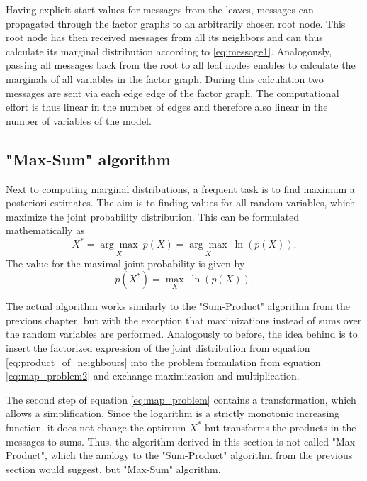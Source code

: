 \documentclass{sigkdd}
\begin{document}
Having explicit start values for messages from the leaves, messages can propagated through the factor graphs to an arbitrarily chosen root node. This root node has then received messages from all its neighbors and can thus calculate its marginal distribution according to \ref{eq:message1}. Analogously, passing all messages back from the root to all leaf nodes enables to calculate the marginals of all variables in the factor graph. During this calculation two messages are sent via each edge edge of the factor graph. The computational effort is thus linear in the number of edges and therefore also linear in the number of variables of the model.\\

\subsection{"Max-Sum" algorithm}
Next to computing marginal distributions, a frequent task is to find maximum a posteriori estimates. The aim is to finding values for all random variables, which maximize the joint probability distribution. This can be formulated mathematically as
\begin{equation}\label{eq:map_problem}
X^* = \underset{X}{\arg\max}~ p(X) = \underset{X}{\arg\max}~ \ln (p(X)).
\end{equation}
The value for the maximal joint probability is given by
\begin{equation}\label{eq:map_problem2}
p(X^*) = \underset{X}{\max}~ \ln (p(X)).
\end{equation}


The actual algorithm works similarly to the "Sum-Product" algorithm from the previous chapter, but with the exception that maximizations instead of sums over the random variables are performed. Analogously to before, the idea behind is to insert the factorized expression of the joint distribution from equation \ref{eq:product_of_neighbours} into the problem formulation from equation \ref{eq:map_problem2} and exchange maximization and multiplication.

The second step of equation \ref{eq:map_problem} contains a transformation, which allows a simplification. Since the logarithm is a strictly monotonic increasing function, it does not change the optimum $X^*$ but transforms the products in the messages to sums. Thus, the algorithm derived in this section is not called "Max-Product", which the analogy to the "Sum-Product" algorithm from the previous section would suggest, but "Max-Sum" algorithm.
\end{document}
